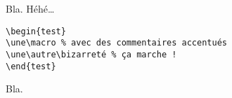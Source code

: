 \documentclass[a4paper]{article}
\begin{document}
Bla. Héhé\dots
\begin{lstlisting}[language={[LaTeX]TeX}]
\begin{test}
\une\macro % avec des commentaires accentués
\une\autre\bizarreté % ça marche !
\end{test}
\end{lstlisting}
Bla.
\end{document}
